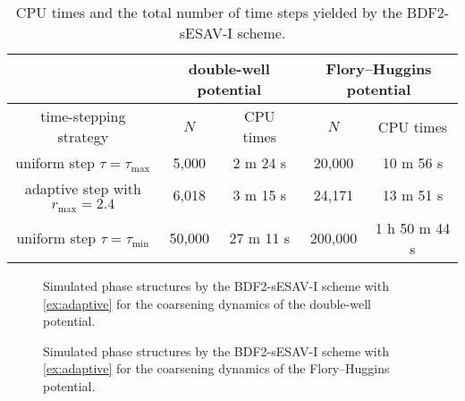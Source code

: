 \documentclass{m2an}
\begin{document}
\begin{table}[!htbp]
	\vspace{-10pt}
	\caption{CPU times and the total number of time steps\label{Ex5_tab1} yielded by the BDF2-sESAV-I scheme.}%
	\label{tab1_Ex2}
	{\footnotesize\begin{tabular*}{\columnwidth}{@{\extracolsep\fill}ccccc@{\extracolsep\fill}}
					\toprule
					& \multicolumn{2}{c}{double-well potential} & \multicolumn{2}{c}{Flory--Huggins potential}\\
					\midrule
					time-stepping strategy  & $N$ &  CPU times & $N$ & CPU times \\
					\midrule
					uniform step  $ \tau = \tau_{\max}$      &   5,000   &  2 m 24 s   &  20,000   &  10 m 56 s            \\ 
					adaptive step with $ r_{\max} = 2.4 $    &   6,018   &  3 m 15 s   &  24,171   &  13 m 51 s            \\ 
					uniform step  $ \tau = \tau_{\min} $     &   50,000  &  27 m 11 s  &  200,000  &  1 h 50 m 44 s          \\ 
					\bottomrule
			\end{tabular*}}
	\vspace{-8pt}
\end{table}
%
\begin{figure}[!htbp]
	\vspace{-8pt}
	\centering
	\setlength{\abovecaptionskip}{0.0cm} 
	\setlength{\belowcaptionskip}{0.0cm}
	\caption{ Simulated phase structures by the BDF2-sESAV-I scheme with \eqref{ex:adaptive} for the coarsening dynamics of the double-well potential.}
	\label{figEx2_7}
	\vspace{-8pt}
\end{figure}
%
\begin{figure}[!htbp]
	\vspace{-8pt}
	\centering
	\setlength{\abovecaptionskip}{0.0cm} 
	\setlength{\belowcaptionskip}{0.0cm}
	\caption{ Simulated phase structures by the BDF2-sESAV-I scheme with \eqref{ex:adaptive} for the coarsening dynamics of the Flory--Huggins potential.}
	\label{figEx2_8}
	\vspace{-6pt}
\end{figure}
\end{document}
